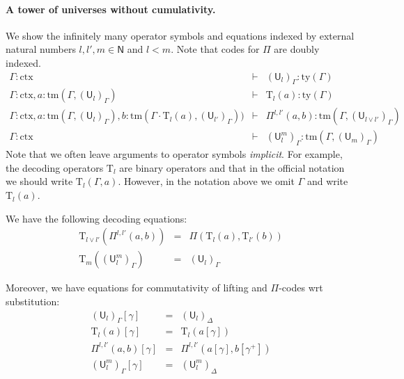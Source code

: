 \documentclass[11pt,a4paper]{article}
\theoremstyle{definition}
\newcommand{\NN}{\mathsf{N}}
\newcommand{\UU}{\mathsf{U}}
\def\NN{\mathsf{N}}
\def\UU{\mathsf{U}}
\newcommand{\N}{\mathsf{N}}
\def\Pihat{\Pi}
\newcommand{\ctx}{\mathrm{ctx}}
\newcommand{\ty}{\mathrm{ty}}
\newcommand{\tm}{\mathrm{tm}}
\def\U{\mathsf{U}}
\newcommand{\Ta}{\mathrm{T}}
\begin{document}
\paragraph{A tower of universes without cumulativity.} We show the infinitely many operator symbols and equations indexed by external natural numbers $l, l' , m \in \NN$ and $l < m$.
Note that codes for $\Pi$ are doubly indexed.
\begin{eqnarray*}
\Gamma : \ctx &\vdash& (\U_{l})_\Gamma : \ty(\Gamma)\\
\Gamma : \ctx, a : \tm(\Gamma,(\U_{l})_\Gamma) &\vdash& {\Ta_{l}}(a) : \ty(\Gamma)\\
\Gamma : \ctx,
a : \tm(\Gamma,(\U_{l})_\Gamma),
b :  \tm(\Gamma \cdot \Ta_{l}(a), (\U_{l'})_\Gamma))
&\vdash&
 \Pihat^{l,l'}(a,b) : \tm(\Gamma,(\U_{l \vee l'})_\Gamma)\\
 \Gamma : \ctx&\vdash&(\UU^m_l)_\Gamma: \tm(\Gamma,(\UU_{m})_\Gamma)
\end{eqnarray*}
Note that we often leave arguments to operator symbols {\em implicit}. For example, the decoding operators $\Ta_l$ are binary operators and that in the official notation we should write $\Ta_l(\Gamma,a)$. However, in the notation above we omit $\Gamma$ and write $\Ta_l(a)$.

We have the following decoding equations:
\begin{eqnarray*}
\Ta_{l \vee l'}(\Pi^{l,l'}(a,b)) &=& \Pi(\Ta_l(a),\Ta_{l'}(b))\\
\Ta_{m}((\UU^m_l)_\Gamma) &=& (\UU_l)_\Gamma
\end{eqnarray*}

Moreover, we have equations for commutativity of lifting and $\Pi$-codes wrt substitution:
 \begin{eqnarray*}
(\U_l)_\Gamma [ \gamma ] &=& (\U_l)_\Delta\\
\Ta_l(a) [ \gamma ] &=& \Ta_l(a[ \gamma ] )\\
\Pi^{l,l'}(a,b)[ \gamma ] &=& \Pi^{l,l'}(a [ \gamma ], b[ \gamma^+ ])\\
(\UU^m_l)_\Gamma[ \gamma ] &=&(\UU^m_l)_\Delta
\end{eqnarray*}
\end{document}
